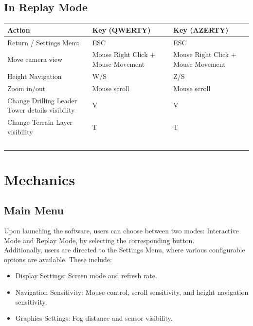 \documentclass{article}
\begin{document}
\subsection{In Replay Mode}
\begin{table}[h]
    \begin{tabular}{|l|l|l|}
        \hline
        \textbf{Action} & \textbf{Key (QWERTY)} & \textbf{Key (AZERTY)}\\
        \hline
        Return / Settings Menu & ESC & ESC\\
        \hline
        Move camera view & Mouse Right Click + Mouse Movement & Mouse Right Click + Mouse Movement\\
        \hline
        Height Navigation & W/S & Z/S\\
        \hline
        Zoom in/out & Mouse scroll & Mouse scroll\\
        \hline
        Change Drilling Leader Tower details visibility	& V & V\\
        \hline
        Change Terrain Layer visibility & T & T\\\
        \hline
    \end{tabular}
\end{table}





\newpage
\section{Mechanics}
\subsection{Main Menu}\hfill

Upon launching the software, users can choose between two modes: Interactive Mode and Replay Mode, by selecting the corresponding button. \\

Additionally, users are directed to the Settings Menu, where various configurable options are available. These include:
\begin{itemize}
    \item Display Settings: Screen mode and refresh rate.
    \item Navigation Sensitivity: Mouse control, scroll sensitivity, and height navigation sensitivity.
    \item Graphics Settings: Fog distance and sensor visibility.
\end{itemize}
\end{document}
